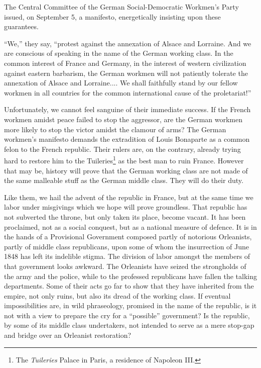 \documentclass{book}
\begin{document}
The Central Committee of the German Social-Democratic Workmen’s Party
issued, on September 5, a manifesto, energetically insisting upon these
guarantees.

``We,'' they say, ``protest against the annexation of Alsace and Lorraine.
And we are conscious of speaking in the name of the German working class.
In the common interest of France and Germany, in the interest of western
civilization against eastern barbarism, the German workmen will not
patiently tolerate the annexation of Alsace and Lorraine.... We shall
faithfully stand by our fellow workmen in all countries for the common
international cause of the proletariat!''

Unfortunately, we cannot feel sanguine of their immediate success. If the
French workmen amidst peace failed to stop the aggressor, are the German
workmen more likely to stop the victor amidst the clamour of arms? The
German workmen’s manifesto demands the extradition of Louis Bonaparte as
a common felon to the French republic. Their rulers are, on the contrary,
already trying hard to restore him to the Tuileries\footnote{ The
\emph{Tuileries} Palace in Paris, a residence of Napoleon III.} as the best man
to ruin France. However that may be, history will prove that the German
working class are not made of the same malleable stuff as the German
middle class. They will do their duty.

Like them, we hail the advent of the republic in France, but at the same
time we labor under misgivings which we hope will prove groundless. That
republic has not subverted the throne, but only taken its place, become
vacant. It has been proclaimed, not as a social conquest, but as
a national measure of defence. It is in the hands of a Provisional
Government composed partly of notorious Orleanists, partly of middle class
republicans, upon some of whom the insurrection of June 1848 has left its
indelible stigma. The division of labor amongst the members of that
government looks awkward. The Orleanists have seized the strongholds of
the army and the police, while to the professed republicans have fallen
the talking departments. Some of their acts go far to show that they have
inherited from the empire, not only ruins, but also its dread of the
working class. If eventual impossibilities are, in wild phraseology,
promised in the name of the republic, is it not with a view to prepare the
cry for a ``possible'' government? Is the republic, by some of its middle
class undertakers, not intended to serve as a mere stop-gap and bridge
over an Orleanist restoration?
\end{document}
